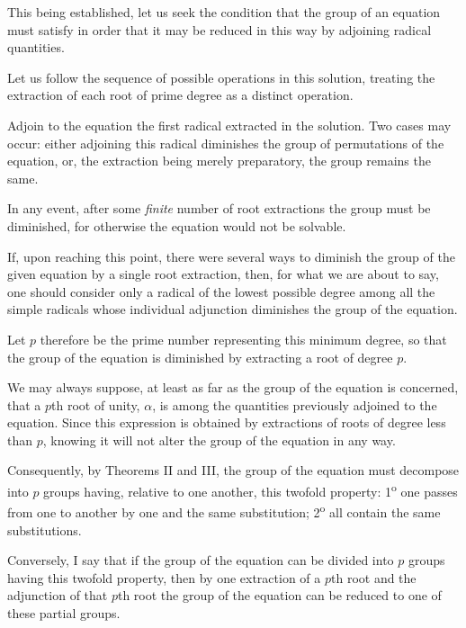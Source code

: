 This being established, let us seek the condition that the group of an equation
must satisfy in order that it may be reduced in this way by adjoining radical
quantities.

Let us follow the sequence of possible operations in this solution, treating
the extraction of each root of prime degree as a distinct operation.


Adjoin to the equation the first radical extracted in the solution. Two cases
may occur: either adjoining this radical diminishes the group of permutations
of the equation, or, the extraction being merely preparatory, the group remains
the same.

In any event, after some \emph{finite} number of root extractions the group must
be diminished, for otherwise the equation would not be solvable.

If, upon reaching this point, there were several ways to diminish the group of
the given equation by a single root extraction, then, for what we are about to
say, one should consider only a radical of the lowest possible degree among all
the simple radicals whose individual adjunction diminishes the group of the
equation.

Let $p$ therefore be the prime number representing this minimum degree, so that
the group of the equation is diminished by extracting a root of degree $p$.

We may always suppose, at least as far as the group of the equation is
concerned, that a $p$th root of unity, $\alpha$, is among the quantities
previously adjoined to the equation. Since this expression is obtained by
extractions of roots of degree less than $p$, knowing it will not alter the
group of the equation in any way.

Consequently, by Theorems II and III, the group of the equation must decompose
into $p$ groups having, relative to one another, this twofold property:
1\textsuperscript{o} one passes from one to another by one and the same substitution;
2\textsuperscript{o} all contain the same substitutions.

Conversely, I say that if the group of the equation can be divided into $p$
groups having this twofold property, then by one extraction of a $p$th root and
the adjunction of that $p$th root the group of the equation can be reduced to
one of these partial groups.

